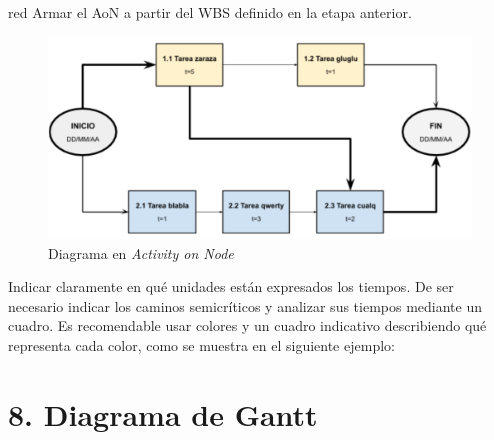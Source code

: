 \documentclass[11pt]{charter}
\begin{document}
\begin{consigna}{red}
Armar el AoN a partir del WBS definido en la etapa anterior. 



\end{consigna}

\begin{figure}[htpb]
\centering 
\includegraphics[width=.8\textwidth]{./Figuras/AoN.png}
\caption{Diagrama en \textit{Activity on Node}}
\label{fig:AoN}
\end{figure}

Indicar claramente en qué unidades están expresados los tiempos.
De ser necesario indicar los caminos semicríticos y analizar sus tiempos mediante un cuadro.
Es recomendable usar colores y un cuadro indicativo describiendo qué representa cada color, como se muestra en el siguiente ejemplo:



\section{8. Diagrama de Gantt}
\label{sec:gantt}
\end{document}
